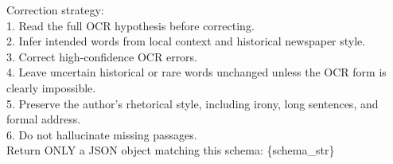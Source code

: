 \documentclass[11pt]{extarticle}
\begin{document}
\begin{mdframed}[backgroundcolor=gray!10, linewidth=0pt, innertopmargin=10pt, innerbottommargin=10pt, innerleftmargin=10pt, innerrightmargin=10pt]
\noindent Correction strategy:\\
1. Read the full OCR hypothesis before correcting.\\
2. Infer intended words from local context and historical newspaper style.\\
3. Correct high-confidence OCR errors.\\
4. Leave uncertain historical or rare words unchanged unless the OCR form is clearly impossible.\\
5. Preserve the author's rhetorical style, including irony, long sentences, and formal address.\\
6. Do not hallucinate missing passages.\\

\noindent Return ONLY a JSON object matching this schema: \{schema\_str\}
\end{mdframed}
\end{document}
